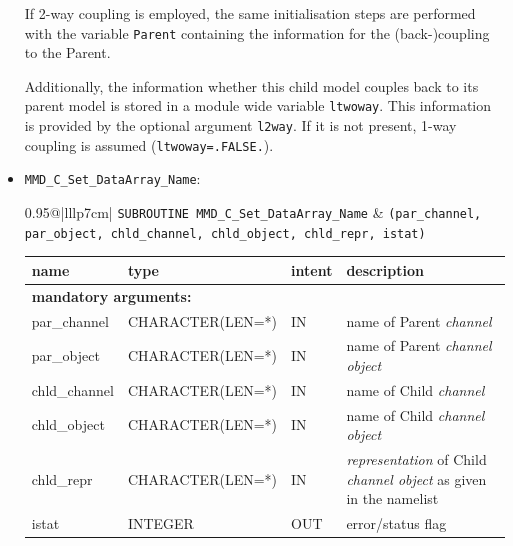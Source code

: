 \documentclass[twoside]{article}
\begin{document}
\begin{itemize}
If 2-way coupling is employed, the same initialisation steps are
performed with the variable  \verb|Parent| containing the information for the
(back-)coupling to the Parent.

Additionally, the information whether this child model couples back to its
parent model is stored in a module wide variable \verb|ltwoway|. This
information is provided by the optional argument \verb|l2way|. If it
is not present, 1-way coupling is assumed (\verb|ltwoway=.FALSE.|).  
\item  \verb|MMD_C_Set_DataArray_Name|:\\
\vspace*{-0.3cm}

\begin{tabular*}{0.95\textwidth}{@{\extracolsep\fill}|lllp{7cm}|}
\hline
{}
{\tt SUBROUTINE MMD\_C\_Set\_DataArray\_Name} &
{\tt (par\_channel, par\_object, chld\_channel, chld\_object, chld\_repr, istat)}\\
\hline
\end{tabular*}
\begin{tabular*}{0.95\textwidth}{@{\extracolsep\fill}|lllp{7cm}|}
name & type & intent & description\\
\hline
\multicolumn{4}{|l|}{\bf mandatory arguments:}\\
par\_channel & {\footnotesize CHARACTER(LEN=*)} & IN & name of Parent {\it channel} \\
par\_object  & {\footnotesize CHARACTER(LEN=*)} & IN & name of Parent {\it channel object} \\
chld\_channel & {\footnotesize CHARACTER(LEN=*)} & IN & name of Child {\it channel} \\
chld\_object  & {\footnotesize CHARACTER(LEN=*)} & IN & name of Child {\it channel object} \\
chld\_repr    & {\footnotesize CHARACTER(LEN=*)} & IN & {\it representation} of Child {\it channel object} as given in the namelist \\
istat    & {\footnotesize INTEGER} & OUT & error/status flag \\
\hline
\end{tabular*}
\smallskip


\end{itemize}
\end{document}
